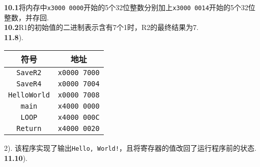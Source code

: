 \documentclass[UTF8]{ctexart}
\begin{document}
\pagestyle{main}
\noindent\textbf{10.1}\quad 将内存中\texttt{x3000 0000}开始的5个32位整数分别加上\texttt{x3000 0014}开始的5个32位整数，并存回.\\
\noindent\textbf{10.2}\quad R1的初始值的二进制表示含有7个1时，R2的最终结果为7.\\
\noindent\textbf{11.8}).
\begin{center}
	\begin{tabular}{cc}
		\toprule
		符号               & 地址                \\
		\midrule
		\texttt{SaveR2}    & \texttt{x0000 7000} \\
		\texttt{SaveR4}    & \texttt{x0000 7004} \\
		\texttt{HelloWorld} & \texttt{x0000 7008} \\
		\texttt{main}      & \texttt{x4000 0000} \\
		\texttt{LOOP}      & \texttt{x4000 000C} \\
		\texttt{Return}    & \texttt{x4000 0020} \\
		\bottomrule
	\end{tabular}
\end{center}
2). 该程序实现了输出\texttt{Hello, World!}，且将寄存器的值改回了运行程序前的状态.\\
\noindent\textbf{11.10}).
\end{document}
